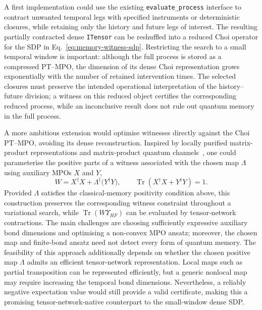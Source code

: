 A first implementation could use the existing \texttt{evaluate\_process} interface to contract unwanted temporal legs with specified instruments or deterministic closures, while retaining only the history and future legs of interest.
The resulting partially contracted dense \texttt{ITensor} can be reshuffled into a reduced Choi operator for the SDP in Eq.~\eqref{eq:memory-witness-sdp}.
Restricting the search to a small temporal window is important: although the full process is stored as a compressed PT--MPO, the dimension of its dense Choi representation grows exponentially with the number of retained intervention times.
The selected closures must preserve the intended operational interpretation of the history--future division; a witness on this reduced object certifies the corresponding reduced process, while an inconclusive result does not rule out quantum memory in the full process.

A more ambitious extension would optimise witnesses directly against the Choi PT--MPO, avoiding its dense reconstruction.
Inspired by locally purified matrix-product representations and matrix-product quantum channels~\cite{Verstraete2004,stucchi2026channels,yauk2026locallypurifiable}, one could parameterise the positive parts of a witness associated with the chosen map $\Lambda$ using auxiliary MPOs $X$ and $Y$,
%
\begin{equation}
    \label{eq:memory-witness-mpo}
    W=X^\dagger X+\Lambda^\dagger\!\bigl(Y^\dagger Y\bigr),
    \qquad
    \operatorname{Tr}(X^\dagger X+Y^\dagger Y)=1.
\end{equation}
%
Provided $\Lambda$ satisfies the classical-memory positivity condition above, this construction preserves the corresponding witness constraint throughout a variational search, while $\operatorname{Tr}(W\Upsilon_{HF})$ can be evaluated by tensor-network contractions.
The main challenges are choosing sufficiently expressive auxiliary bond dimensions and optimising a non-convex MPO ansatz; moreover, the chosen map and finite-bond ansatz need not detect every form of quantum memory.
The feasibility of this approach additionally depends on whether the chosen positive map $\Lambda$ admits an efficient tensor-network representation. 
Local maps such as partial transposition can be represented efficiently, but a generic nonlocal map may require increasing the temporal bond dimensions.
Nevertheless, a reliably negative expectation value would still provide a valid certificate, making this a promising tensor-network-native counterpart to the small-window dense SDP.
